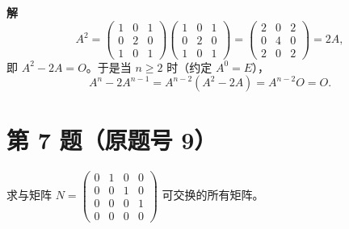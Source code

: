 \documentclass[11pt,a4paper]{ctexart}
\newenvironment{problem}[1]
  {\par\medskip\noindent\textbf{#1}\quad}
  {\par}
\newenvironment{solution}
  {\par\noindent\textbf{解}\quad}
  {\par}
\begin{document}
\begin{solution}
\[
A^2=\begin{pmatrix}1&0&1\\0&2&0\\1&0&1\end{pmatrix}\begin{pmatrix}1&0&1\\0&2&0\\1&0&1\end{pmatrix}
=\begin{pmatrix}2&0&2\\0&4&0\\2&0&2\end{pmatrix}=2A,
\]
即 $A^2-2A=O$。于是当 $n\ge2$ 时（约定 $A^0=E$），
\[
A^n-2A^{n-1}=A^{n-2}(A^2-2A)=A^{n-2}O=O.
\]
\end{solution}

\section*{第 7 题（原题号 9）}

\begin{problem}{}求与矩阵 $N=\begin{pmatrix}0&1&0&0\\0&0&1&0\\0&0&0&1\\0&0&0&0\end{pmatrix}$ 可交换的所有矩阵。\end{problem}
\end{document}
